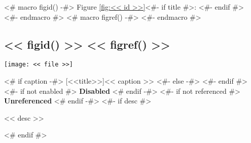 <# macro figid() -#>
Figure \ref{fig:<< id >>}<#- if title #>: <#- endif #>
<#- endmacro #>
<# macro figref() -#>
\color{light-gray}
<#- endmacro #>

\begin{samepage}
\subsection[<< figid() >>~~~<< figref() >>]{<< figid() >> \hfill << figref() >>}
\nopagebreak
\noindent\centerline{\texttt{[image: << file >>]}}
<# if caption -#>
\nopagebreak
{}[<<title>>]{<< caption >>}
<#- else -#>
<#- endif #>\label{fig:<< id >>}
<#- if not enabled #>
{\color{red}\textbf{Disabled}}
<# endif -#>
<#- if not referenced #>
{\color{red}\textbf{Unreferenced}}
<# endif -#>
<#- if desc #>
\nopagebreak
\begin{figinfo}<< desc >>\end{figinfo}
<# endif #>
\end{samepage}
\vspace{20pt}
